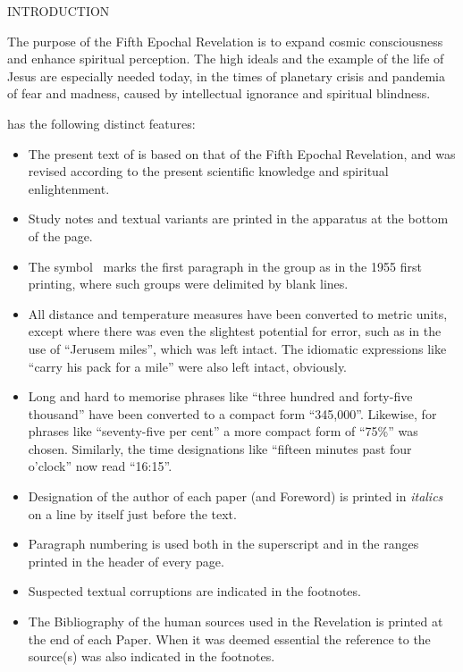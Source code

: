 \newpage
\thispagestyle{empty}
\makeatletter
{}%
\makeatother

\begin{center}\bibpapertitlefont INTRODUCTION\end{center}
\introfontsize

The purpose of the Fifth Epochal Revelation is to expand cosmic consciousness and enhance spiritual perception.
The high ideals and the example of the life of Jesus are especially needed today,
in the times of planetary crisis and pandemia of fear and madness, caused by intellectual ignorance and spiritual blindness.

 has the following distinct features:

\begin{itemize}
\item The present text of  is based on that of the Fifth Epochal Revelation,
and was revised according to the present scientific knowledge and spiritual enlightenment.
\item Study notes and textual variants are printed in the apparatus at the bottom of the page.
\item The symbol \pc\ marks the first paragraph in the group as in the 1955 first printing, where such groups were delimited by blank lines.
\item All distance and temperature measures have been converted to metric units, except where there was even the slightest potential for error, such as in the use of ``Jerusem miles'', which was left intact. The idiomatic expressions like ``carry his pack for a mile'' were also left intact, obviously.
\item Long and hard to memorise phrases like ``three hundred and forty\hyp{}five thousand'' have been converted to a compact form ``345,000''. Likewise, for phrases like ``seventy\hyp{}five per cent'' a more compact form of ``75\%'' was chosen. Similarly, the time designations like ``fifteen minutes past four o’clock'' now read ``16:15''.
\item Designation of the author of each paper (and Foreword) is printed in \textit{italics} on a line by itself just before the text.
\item Paragraph numbering is used both in the superscript and in the ranges printed in the head\-er of every page.
\item Suspected textual corruptions are indicated in the footnotes.
\item The Bibliography of the human sources used in the Revelation is printed at the end of each Paper.
      When it was deemed essential the reference to the source(s) was also indicated in the footnotes.
\end{itemize}

